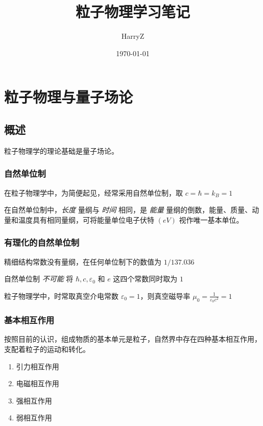 \documentclass[oneside,a4paper,openany,11pt]{ctexbook}
\title{粒子物理学习笔记}
\author{HarryZ}
\date{\today}
\begin{document}
\maketitle

\chapter{粒子物理与量子场论}

\section{概述}

粒子物理学的理论基础是量子场论。

\subsection{自然单位制}

在粒子物理学中，为简便起见，经常采用自然单位制，取 $c=\hbar=k_B=1$

在自然单位制中，\emph{长度} 量纲与 \emph{时间} 相同，是 \emph{能量} 量纲的倒数，能量、质量、动量和温度具有相同量纲，可将能量单位电子伏特 $(\unit{eV})$ 视作唯一基本单位。

\subsection{有理化的自然单位制}

精细结构常数没有量纲，在任何单位制下的数值为 $1/137.036$

自然单位制 \emph{不可能} 将 $\hbar, c, \varepsilon_0$ 和 $e$ 这四个常数同时取为 $1$

粒子物理学中，时常取真空介电常数 $\varepsilon_0=1$，则真空磁导率 $\mu_0=\frac{1}{\varepsilon_0 c^2}=1$

\subsection{基本相互作用}

按照目前的认识，组成物质的基本单元是粒子，自然界中存在四种基本相互作用，支配着粒子的运动和转化。

\begin{enumerate}
    \item 引力相互作用
    \item 电磁相互作用
    \item 强相互作用
    \item 弱相互作用
\end{enumerate}
\end{document}
